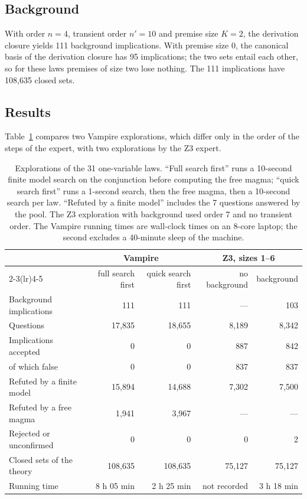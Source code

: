 \documentclass[11pt,a4paper]{article}
\theoremstyle{definition}
\theoremstyle{remark}
\begin{document}
\subsection{Background}

With order $n = 4$, transient order $n' = 10$ and premise size $K = 2$, the derivation closure yields 111 background implications. With premise size $0$, the canonical basis of the derivation closure has 95 implications; the two sets entail each other, so for these laws premises of size two lose nothing. The 111 implications have 108,635 closed sets.

\subsection{Results}

Table~\ref{tab:runs31} compares two Vampire explorations, which differ only in the order of the steps of the expert, with two explorations by the Z3 expert.

\begin{table}[ht]
\centering
\small
\begin{tabularx}{\textwidth}{@{}Xrrrr@{}}
\toprule
 & \multicolumn{2}{c}{Vampire} & \multicolumn{2}{c}{Z3, sizes 1--6} \\
\cmidrule(lr){2-3}\cmidrule(lr){4-5}
 & full search first & quick search first & no background & background \\
\midrule
Background implications & 111 & 111 & --- & 103 \\
Questions & 17,835 & 18,655 & 8,189 & 8,342 \\
Implications accepted & 0 & 0 & 887 & 842 \\
\quad of which false & 0 & 0 & 837 & 837 \\
Refuted by a finite model & 15,894 & 14,688 & 7,302 & 7,500 \\
Refuted by a free magma & 1,941 & 3,967 & --- & --- \\
Rejected or unconfirmed & 0 & 0 & 0 & 2 \\
Closed sets of the theory & 108,635 & 108,635 & 75,127 & 75,127 \\
Running time & 8 h 05 min & 2 h 25 min & not recorded & 3 h 18 min \\
\bottomrule
\end{tabularx}
\caption{Explorations of the 31 one-variable laws. ``Full search first'' runs a 10-second finite model search on the conjunction before computing the free magma; ``quick search first'' runs a 1-second search, then the free magma, then a 10-second search per law. ``Refuted by a finite model'' includes the 7 questions answered by the pool. The Z3 exploration with background used order 7 and no transient order. The Vampire running times are wall-clock times on an 8-core laptop; the second excludes a 40-minute sleep of the machine.}\label{tab:runs31}
\end{table}
\end{document}
